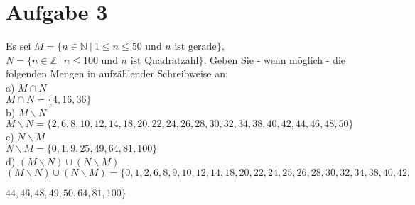 \section*{Aufgabe 3}

Es sei $M = \{n \in \mathbb{N} \ | \ 1 \leq n \leq 50 \text{ und } n \text{ ist gerade} \}$, $N = \{n \in \mathbb{Z} \ | \ n \leq 100 \text{ und } n \text{ ist Quadratzahl} \}$.
Geben Sie - wenn möglich - die folgenden Mengen in aufzählender Schreibweise an:\\

a) $M \cap N$\\

$M \cap N = \{4, 16, 36\}$\\

b) $M \backslash N$\\

$M \backslash N = \{2, 6, 8, 10, 12, 14, 18, 20, 22, 24, 26, 28, 30, 32, 34, 38, 40, 42, 44, 46, 48, 50\}$\\

c) $N \backslash M$\\

$N \backslash M = \{0, 1, 9, 25, 49, 64, 81, 100\}$\\

d) $(M \backslash N) \cup (N \backslash M)$\\

$(M \backslash N) \cup (N \backslash M) = \{0, 1, 2, 6, 8, 9, 10, 12, 14, 18, 20, 22, 24, 25, 26, 28, 30, 32, 34, 38, 40, 42,$

\hspace{3.9cm}$44, 46, 48, 49, 50, 64, 81, 100\}$